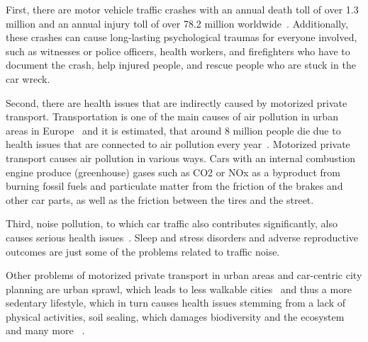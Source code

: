 First, there are motor vehicle traffic crashes with an annual death toll of over 1.3 million and an annual injury toll of over 78.2 million worldwide~\cite{bhalla2014transport}.
Additionally, these crashes can cause long-lasting psychological traumas for everyone involved, such as witnesses or police officers, health workers, and firefighters who have to document the crash, help injured people, and rescue people who are stuck in the car wreck.

Second, there are health issues that are indirectly caused by motorized private transport.
Transportation is one of the main causes of air pollution in urban areas in Europe~\cite{european2019european} and it is estimated, that around 8 million people die due to health issues that are connected to air pollution every year~\cite{forouzanfar2016global}. 
Motorized private transport causes air pollution in various ways.
Cars with an internal combustion engine produce (greenhouse) gases such as CO2 or NOx as a byproduct from burning fossil fuels and particulate matter from the friction of the brakes and other car parts, as well as the friction between the tires and the street.

Third, noise pollution, to which car traffic also contributes significantly, also causes serious health issues~\cite{khreis2016health}.
Sleep and stress disorders and adverse reproductive outcomes are just some of the problems related to traffic noise.

Other problems of motorized private transport in urban areas and car-centric city planning are urban sprawl, which leads to less walkable cities~\cite{patacchini2009urban} and thus a more sedentary lifestyle, which in turn causes health issues stemming from a lack of physical activities, soil sealing, which damages biodiversity and the ecosystem~\cite{tobias2018soil} and many more ~\cite{bozovic2021non,pritchard2022maas,mayers2020whose}.  


